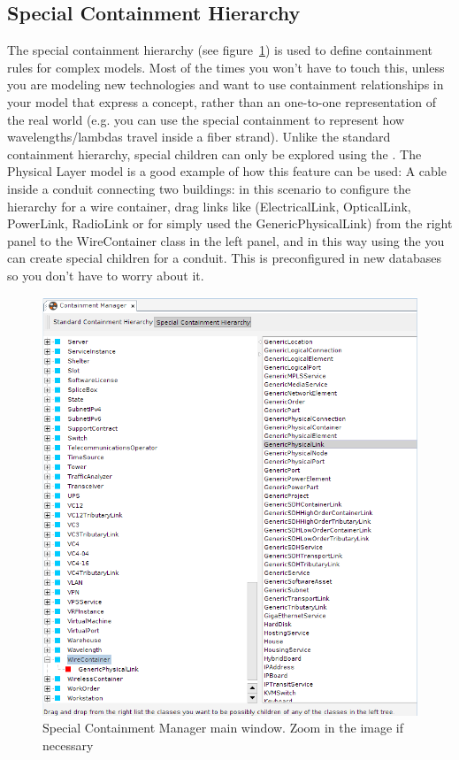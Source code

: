 \documentclass[a4paper]{article}
\begin{document}
	\newpage
	
	\subsection{Special Containment Hierarchy} \label{sec:special_containment_hierarchy}
	The special containment hierarchy (see figure~\ref{fig:special_containment_manager}) is used to define containment rules for complex models. Most of the times you won't have to touch this, unless you are modeling new technologies and want to use containment relationships in your model that express a concept, rather than an one-to-one representation of the real world (e.g. you can use the special containment to represent how wavelengths/lambdas travel inside a fiber strand). Unlike the standard containment hierarchy, special children can only be explored using the \textbf{}. The Physical Layer model is a good example of how this feature can be used: A cable inside a conduit connecting two buildings: in this scenario to configure the hierarchy for a wire container, drag links like (ElectricalLink, OpticalLink, PowerLink, RadioLink or for simply used the GenericPhysicalLink) from the right panel to the WireContainer class in the left panel, and in this way using the \textbf{} you can create special children for a conduit. This is preconfigured in new databases so you don't have to worry about it.
	
	\begin{figure}[h!]
		\centering
		\includegraphics[width=0.8\linewidth]{img/special_containment_manager.png}
		\caption{Special Containment Manager main window. Zoom in the image if necessary}
		\label{fig:special_containment_manager}
	\end{figure}
	
\end{document}
